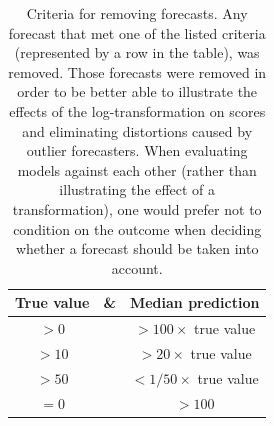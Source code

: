 \documentclass{article}
\begin{document}
\begin{table}
\centering
\begin{tabular}{ccc}
\toprule
True value & \& & Median prediction\\
\midrule
$>0$ & \ & $>100\times$ true value\\
$>10$ & \  & $>20\times$ true value\\
$>50$ & \  & $<1/50\times$ true value\\
$= 0$ & \  & $>100$\\
\bottomrule
\end{tabular}
\caption{Criteria for removing forecasts. Any forecast that met one of the listed criteria (represented by a row in the table), was removed. Those forecasts were removed in order to be better able to illustrate the effects of the log-transformation on scores and eliminating distortions caused by outlier forecasters. When evaluating models against each other (rather than illustrating the effect of a transformation), one would prefer not to condition on the outcome when deciding whether a forecast should be taken into account. }
\label{tab:erroneous}
\end{table}
\end{document}
